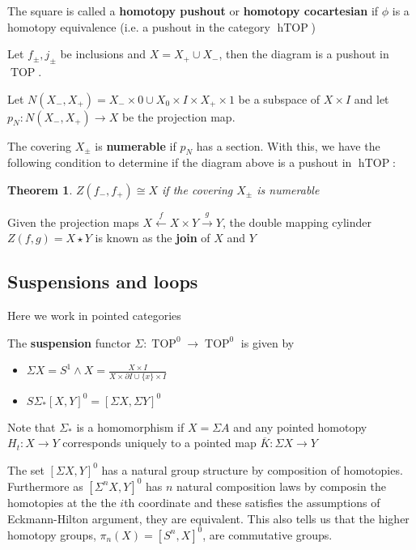 \documentclass[12pt]{article}
\newtheorem{thm}{Theorem}[section]
\DeclareMathOperator{\TOP}{TOP}
\DeclareMathOperator{\hTOP}{hTOP}
\begin{document}
The square is called a \textbf{homotopy pushout} or \textbf{homotopy cocartesian} if $\phi$ is a homotopy equivalence (i.e. a pushout in the category $\hTOP$)

Let $f_\pm,j_\pm$ be inclusions and $X=X_+\cup X_-$, then the diagram is a pushout in $\TOP$.

Let $N\left(X_-,X_+\right)=X_-\times0\cup X_0\times I\times X_+\times 1$ be a subspace of $X\times I$ and let $p_N:N\left(X_-,X_+\right)\to X$ be the projection map.

The covering $X_\pm$ is \textbf{numerable} if $p_N$ has a section. With this, we have the following condition to determine if the diagram above is a pushout in $\hTOP$:

\begin{thm}
    $Z\left(f_-,f_+\right)\cong X$ if the covering $X_\pm$ is numerable
\end{thm}

Given the projection maps $X\overset f\leftarrow X\times Y\overset g\to Y$, the double mapping cylinder $Z(f,g)=X\star Y$ is known as the \textbf{join} of $X$ and $Y$

\subsection{Suspensions and loops}

Here we work in pointed categories

The \textbf{suspension} functor $\Sigma:\TOP^0\to\TOP^0$ is given by
\begin{itemize}
    \item $\Sigma X=S^1\wedge X=\frac{X\times I}{X\times\partial I\cup\{x\}\times I}$
    \item $S\Sigma_*\left[X,Y\right]^0=\left[\Sigma X,\Sigma Y\right]^0$
\end{itemize}

Note that $\Sigma_*$ is a homomorphism if $X=\Sigma A$ and any pointed homotopy $H_t:X\to Y$ corresponds uniquely to a pointed map $\overline K:\Sigma X\to Y$

The set $\left[\Sigma X,Y\right]^0$ has a natural group structure by composition of homotopies. Furthermore as $\left[\Sigma^nX,Y\right]^0$ has $n$ natural composition laws by composin the homotopies at the the $i$th coordinate and these satisfies the assumptions of Eckmann-Hilton argument, they are equivalent. This also tells us that the higher homotopy groups, $\pi_n(X)=\left[S^n,X\right]^0$, are commutative groups.
\end{document}
